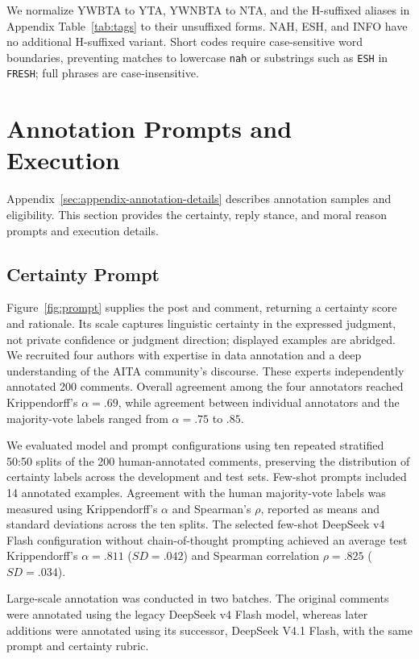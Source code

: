 We normalize YWBTA to YTA, YWNBTA to NTA, and the H-suffixed aliases in
Appendix Table~\ref{tab:tags} to their unsuffixed forms. NAH, ESH, and INFO have no
additional H-suffixed variant. Short codes require case-sensitive word
boundaries, preventing matches to lowercase \texttt{nah} or substrings
such as \texttt{ESH} in \texttt{FRESH}; full phrases are case-insensitive.




\section{Annotation Prompts and Execution}
\label{sec:supp-annotation}

Appendix~\ref{sec:appendix-annotation-details} describes annotation samples
and eligibility. This section provides the certainty, reply stance, and
moral reason prompts and execution details.

\subsection{Certainty Prompt}
\label{sec:supp-certainty-annotation}

Figure~\ref{fig:prompt} supplies the post and comment, returning
a certainty score and rationale. Its scale captures linguistic certainty in the expressed judgment,
not private confidence or judgment direction; displayed examples are abridged. We recruited four authors with expertise in data annotation and a deep
understanding of the AITA community's discourse. These experts
independently annotated 200 comments. Overall agreement among the four annotators reached Krippendorff's $\alpha=.69$, while agreement between individual
annotators and the majority-vote labels ranged from $\alpha=.75$ to $.85$. 

We evaluated model and prompt configurations using ten repeated
stratified 50:50 splits of the 200 human-annotated comments, preserving the distribution of certainty labels across the development and test sets. Few-shot prompts included 14 annotated examples. Agreement with the human majority-vote labels was measured using Krippendorff's $\alpha$ and Spearman's $\rho$, reported as means and standard deviations across the ten splits. The selected few-shot DeepSeek v4 Flash configuration without chain-of-thought prompting achieved an average test
Krippendorff's $\alpha=.811$ ($SD=.042$) and Spearman correlation
$\rho=.825$ ($SD=.034$).

Large-scale annotation was conducted in two batches. The original
comments were annotated using the legacy DeepSeek v4 Flash model,
whereas later additions were annotated using its successor, DeepSeek
V4.1 Flash, with the same prompt and certainty rubric.


